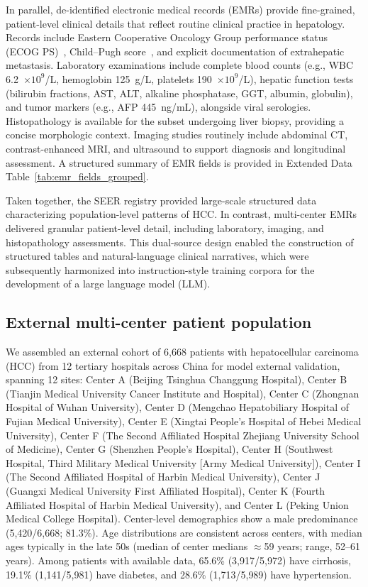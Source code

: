 \documentclass{article}
\begin{document}
In parallel, de-identified electronic medical records (EMRs) provide fine-grained, patient-level clinical details that reflect routine clinical practice in hepatology. Records include Eastern Cooperative Oncology Group performance status (ECOG PS)~\cite{oken_ecog_1982}, Child--Pugh score~\cite{pugh_childpugh_1973}, and explicit documentation of extrahepatic metastasis. Laboratory examinations include complete blood counts (e.g., WBC 6.2~$\times 10^9$/L, hemoglobin 125~g/L, platelets 190~$\times 10^9$/L), hepatic function tests (bilirubin fractions, AST, ALT, alkaline phosphatase, GGT, albumin, globulin), and tumor markers (e.g., AFP 445~ng/mL), alongside viral serologies. Histopathology is available for the subset undergoing liver biopsy, providing a concise morphologic context. Imaging studies routinely include abdominal CT, contrast-enhanced MRI, and ultrasound to support diagnosis and longitudinal assessment. A structured summary of EMR fields is provided in Extended Data Table~\ref{tab:emr_fields_grouped}.

Taken together, the SEER registry provided large-scale structured data characterizing population-level patterns of HCC. In contrast, multi-center EMRs delivered granular patient-level detail, including laboratory, imaging, and histopathology assessments. This dual-source design enabled the construction of structured tables and natural-language clinical narratives, which were subsequently harmonized into instruction-style training corpora for the development of a large language model (LLM).



\subsection{External multi-center patient population}
We assembled an external cohort of 6{,}668 patients with hepatocellular carcinoma (HCC) from 12 tertiary hospitals across China for model external validation, spanning 12 sites: Center A (Beijing Tsinghua Changgung Hospital), Center B (Tianjin Medical University Cancer Institute and Hospital), Center C (Zhongnan Hospital of Wuhan University), Center D (Mengchao Hepatobiliary Hospital of Fujian Medical University), Center E (Xingtai People's Hospital of Hebei Medical University), Center F (The Second Affiliated Hospital Zhejiang University School of Medicine), Center G (Shenzhen People's Hospital), Center H (Southwest Hospital, Third Military Medical University [Army Medical University]), Center I (The Second Affiliated Hospital of Harbin Medical University), Center J (Guangxi Medical University First Affiliated Hospital), Center K (Fourth Affiliated Hospital of Harbin Medical University), and Center L (Peking Union Medical College Hospital). Center-level demographics show a male predominance (5{,}420/6{,}668; 81.3\%). Age distributions are consistent across centers, with median ages typically in the late 50s (median of center medians $\approx$59 years; range, 52–61 years). Among patients with available data, 65.6\% (3{,}917/5{,}972) have cirrhosis, 19.1\% (1{,}141/5{,}981) have diabetes, and 28.6\% (1{,}713/5{,}989) have hypertension.
\end{document}
